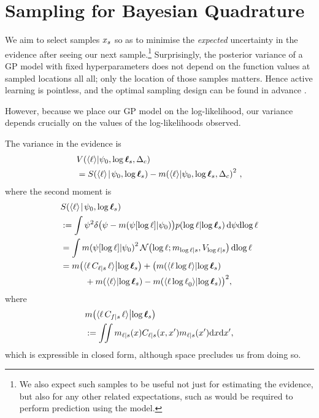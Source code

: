 \documentclass{article}
\begin{document}
\section{Sampling for Bayesian Quadrature}

We aim to select samples $\lfv_s$ so as to minimise the \textit{expected} uncertainty in the evidence after seeing our next sample.\footnote{We also expect such samples to be useful not just for estimating the evidence, but also for any other related expectations, such as would be required to perform prediction using the model.}
Surprisingly, the posterior variance of a GP model with fixed hyperparameters does not depend on the function values at sampled locations all all; only the location of those samples matters. Hence active learning is pointless, and the optimal sampling design can be found in advance \cite{minka2000dqr}.

However, because we place our GP model on the log-likelihood, our variance depends crucially on the values of the log-likelihoods observed. 

% 

The variance in the evidence is
\begin{align*}
& \cov{\inty{\lfn}}{\psi_0,\tvr_s,\Delta_c}\\ 
& = \secm{\inty{\lfn}}{\psi_0,\tvr_s} - \mean{\inty{\lfn}}{\psi_0,\tvr_s,\Delta_c}^2\,,
\end{align*}
where the second moment is 
\begin{align*}
& \secm{\inty{\lfn}}{\psi_0,\tvr_s}  \\
& \deq \int \psi^2 
\delta\bigl(\psi - \mean{\psi[\tr]}{\psi_0}\bigr)
\p{\tr}{\tvr_s}
\ud\psi \ud\tr\\
& = \int \mean{\psi[\tr]}{\psi_0}^2
\N{\tr}{\meancondfn{\tr}{s}}{\covcondfn{\tr}{s}}
 \ud\tr\\
& = \mean{\inty{\lfn\,C_{\lfn|s}\,\lfn}}{\tvr_s}+
\bigl(\mean{\inty{\lfn\, \tr}}{\tvr_s}
 \\
& \hspace{1cm} + 
\mean{\inty{\lfn}}{\tvr_s} - \mean{\inty{\lfn\, \tr_0}}{\tvr_s}\bigr)^2,
\end{align*}
where
\begin{align*}
  &\mean{\inty{\lfn\,C_{f|s}\,\lfn}}{\tvr_s} \\ &\deq
 \iint m_{\lfn|s}(\lfv) C_{\lfn|s}(\lfv,\lfv') m_{\lfn|s}(\lfv') \ud \lfv \ud\lfv',
\end{align*}
which is expressible in closed form, although space precludes us from doing so.
\end{document}
